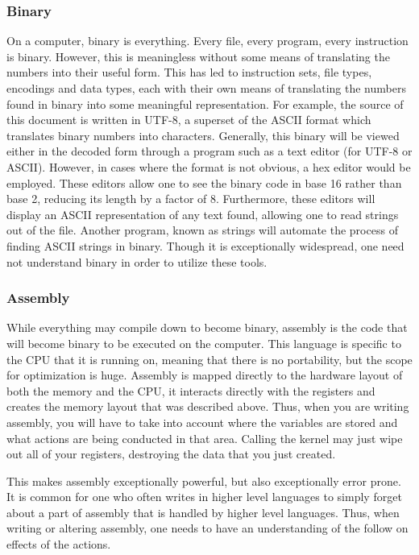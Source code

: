 		\subsubsection{Binary}
			On a computer, binary is everything.
			Every file, every program, every instruction is binary.
			However, this is meaningless without some means of translating the numbers into their useful form.
			This has led to instruction sets, file types, encodings and data types, each with their own means of translating the numbers found in binary into some meaningful representation.
			For example, the source of this document is written in UTF-8, a superset of the ASCII format which translates binary numbers into characters.
			Generally, this binary will be viewed either in the decoded form through a program such as a text editor (for UTF-8 or ASCII).
			However, in cases where the format is not obvious, a hex editor would be employed.
			These editors allow one to see the binary code in base 16 rather than base 2, reducing its length by a factor of 8.
			Furthermore, these editors will display an ASCII representation of any text found, allowing one to read strings out of the file.
			Another program, known as strings will automate the process of finding ASCII strings in binary.
			Though it is exceptionally widespread, one need not understand binary in order to utilize these tools.
		\subsubsection{Assembly}
			While everything may compile down to become binary, assembly is the code that will become binary to be executed on the computer.
			This language is specific to the CPU that it is running on, meaning that there is no portability, but the scope for optimization is huge.
			Assembly is mapped directly to the hardware layout of both the memory and the CPU, it interacts directly with the registers and creates the memory layout that was described above.
			Thus, when you are writing assembly, you will have to take into account where the variables are stored and what actions are being conducted in that area.
			Calling the kernel may just wipe out all of your registers, destroying the data that you just created.

			This makes assembly exceptionally powerful, but also exceptionally error prone.
			It is common for one who often writes in higher level languages to simply forget about a part of assembly that is handled by higher level languages.
			Thus, when writing or altering assembly, one needs to have an understanding of the follow on effects of the actions.

